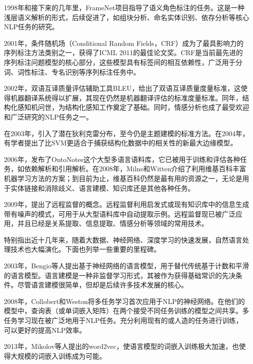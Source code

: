 1998年和接下来的几年里，FrameNet\cite{baker1998berkeley}项目指导了语义角色标注的任务。这是一种浅层语义解析的形式，后续促进了，如组块分析、命名实体识别、依存分析等核心NLP任务的研究。

2001年，条件随机场\cite{lafferty2001conditional}（Conditional Random Fields，CRF）成为了最具影响力的序列标注方法类别之一，获得了ICML 2011的最佳论文奖。CRF是当前最先进的序列标注问题模型的核心部分，这些模型具有标签间的相互依赖性，广泛用于分词、词性标注、专名识别等序列标注任务中。

2002年，双语互译质量评估辅助工具BLEU\cite{papineni2002bleu}，给出了双语互译质量度量标准，这使得机器翻译系统得以扩展，其现在仍然是机器翻译评估的标准度量标准。同年，结构化感知机\cite{collins2002discriminative}问世，为结构化感知工作奠定了基础。同时，情感分析\cite{pang2002thumbs}也成了最受欢迎和广泛研究的NLP任务之一。

在2003年，引入了潜在狄利克雷分布\cite{blei2003latent}，至今仍是主题建模的标准方法。在2004年，有学者提出了比SVM更适合于捕获结构化数据中的相关性的新最大边缘模型\cite{taskar2004max}。

2006年，发布了OntoNotes\cite{hovy2006ontonotes}这个大型多语言语料库，它已被用于训练和评估各种任务，如依赖解析和引用解析。在2008年，Milne和Witten\cite{witten2008effective}介绍了利用维基百科丰富机器学习方法的方案；到目前为止，维基百科仍然是最有用的资源之一，无论是用于实体链接和消除歧义、语言建模、知识库还是其他各种任务。

2009年，提出了远程监督\cite{go2009twitter}的概念。远程监督利用启发式或现有知识库中的信息生成带有噪声的模式，可用于从大型语料库中自动提取示例。远程监督现已被广泛应用，并且已经是关系提取、信息提取、情感分析等领域的常用技术。

特别指出近十几年来，随着大数据、神经网络、深度学习的快速发展，自然语言处理技术也大幅演化。下面也列举一些重要的里程碑。

2003年，Bengio等人提出基于神经网络的语言模型\cite{bengio2003neural}，用于替代传统基于计数和平滑的语言模型。语言建模是一种非监督学习形式，其被作为获得基础常识的先决条件。尽管语言建模很简单，但却是后续许多技术发展的核心。

2008年，Collobert和Weston将多任务学习\cite{collobert2008unified}首次应用于NLP的神经网络。在他们的模型中，查询表（或单词嵌入矩阵）在两个接受不同任务训练的模型之间共享。多任务学习现在被广泛地用于NLP任务。充分利用现有的或人造的任务进行训练，可以更好的提高NLP效率。

2013年，Mikolov等人提出的word2vec\cite{mikolov2013efficient}，使语言模型的词嵌入训练极大加速，也使得大规模的词嵌入训练成为可能。

